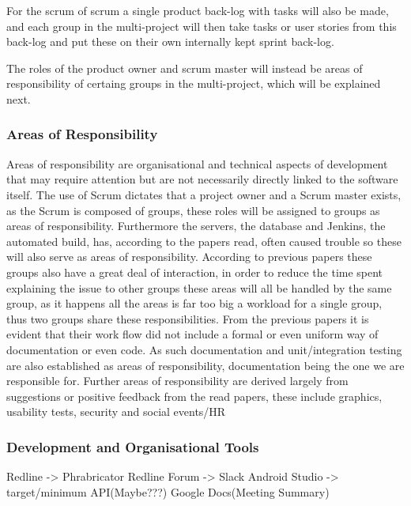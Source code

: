 For the scrum of scrum a single product back-log with tasks will also be made, and each group in the multi-project will then take tasks or user stories from this back-log and put these on their own internally kept sprint back-log.

The roles of the product owner and scrum master will instead be areas of responsibility of certaing groups in the multi-project, which will be explained next.

\subsubsection*{Areas of Responsibility}
Areas of responsibility are organisational and technical aspects of development that may require attention but are not necessarily directly linked to the software itself.
The use of Scrum dictates that a project owner and a Scrum master exists, as the Scrum is composed of groups, these roles will be assigned to groups as areas of responsibility.
Furthermore the servers, the database and Jenkins, the automated build, has, according to the papers read, often caused trouble so these will also serve as areas of responsibility.
According to previous papers these groups also have a great deal of interaction, in order to reduce the time spent explaining the issue to other groups these areas will all be handled by the same group, as it happens all the areas is far too big a workload for a single group, thus two groups share these responsibilities.
From the previous papers it is evident that their work flow did not include a formal or even uniform way of documentation or even code.
As such documentation and unit/integration testing are also established as areas of responsibility, documentation being the one we are responsible for.
Further areas of responsibility are derived largely from suggestions or positive feedback from the read papers, these include graphics, usability tests, security and social events/HR

\subsubsection*{Development and Organisational Tools}
Redline -> Phrabricator
Redline Forum -> Slack
Android Studio -> target/minimum API(Maybe???)
Google Docs(Meeting Summary)
